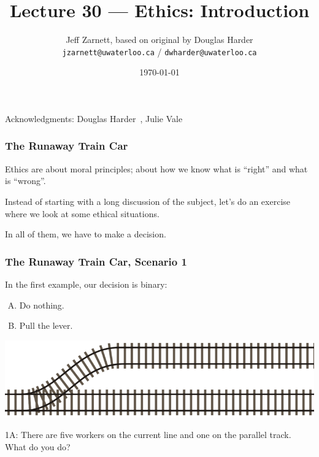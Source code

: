 

\title{Lecture 30 --- Ethics: Introduction }

\author{Jeff Zarnett, based on original by Douglas Harder \\ \small \texttt{jzarnett@uwaterloo.ca} / \texttt{dwharder@uwaterloo.ca}}
\date{\today}




\begin{frame}
  \titlepage

\begin{center}
  \small{Acknowledgments: Douglas Harder~\cite{dwh}, Julie Vale~\cite{jv}}
  \end{center}
\end{frame}



\begin{frame}
\frametitle{The Runaway Train Car}

Ethics are about moral principles; about how we know what is ``right'' and what is ``wrong''. 

Instead of starting with a long discussion of the subject, let's do an exercise where we look at some ethical situations. 

In all of them, we have to make a decision.

\end{frame}



\begin{frame}
\frametitle{The Runaway Train Car, Scenario 1}


In the first example, our decision is binary:\\

\begin{enumerate}[A.]
	\item Do nothing.
	\item Pull the lever.
\end{enumerate}

\begin{center}
	\includegraphics[width=\textwidth]{images/crazytrain}
\end{center}


1A: There are five workers on the current line and one on the parallel track.\\
\quad What do you do?

\end{frame}

